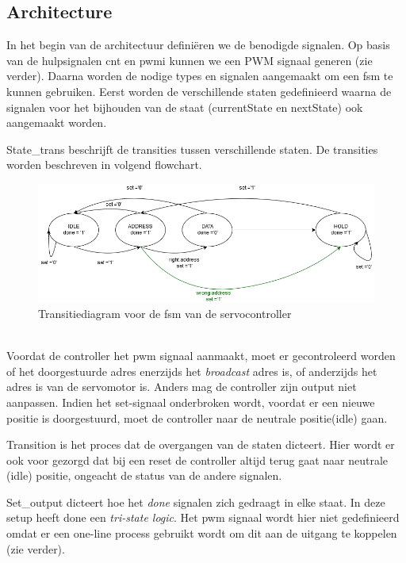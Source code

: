 \subsection{Architecture}
In het begin van de architectuur defini\"{e}ren we de benodigde signalen. Op basis van de hulpsignalen cnt en pwmi kunnen we een PWM signaal generen (zie verder). Daarna worden de nodige types en signalen aangemaakt om een \gls{fsm} te kunnen gebruiken. Eerst worden de verschillende staten gedefinieerd waarna de signalen voor het bijhouden van de staat (currentState en nextState) ook aangemaakt worden.


State\_trans beschrijft de transities tussen verschillende staten. De transities worden beschreven in volgend flowchart.
\begin{figure}[h]
	\centering
	\includegraphics[width=\linewidth]{servocontrol.png}
	\caption{Transitiediagram voor de \gls{fsm} van de servocontroller}
\end{figure}\\
 Voordat de controller het \gls{pwm} signaal aanmaakt, moet er gecontroleerd worden of het doorgestuurde adres enerzijds het \textit{broadcast} adres is, of anderzijds het adres is van de servomotor is. Anders mag de controller zijn output niet aanpassen. Indien het set-signaal onderbroken wordt, voordat er een nieuwe positie is doorgestuurd, moet de controller naar de neutrale positie(idle) gaan.


Transition is het proces dat de overgangen van de staten dicteert. Hier wordt er ook voor gezorgd dat bij een reset de controller altijd terug gaat naar neutrale (idle) positie, ongeacht de status van de andere signalen.


Set\_output dicteert hoe het \textit{done} signalen zich gedraagt in elke staat. In deze setup heeft done een \textit{tri-state logic}. Het \gls{pwm} signaal wordt hier niet gedefinieerd omdat er een one-line process gebruikt wordt om dit aan de uitgang te koppelen (zie verder).

